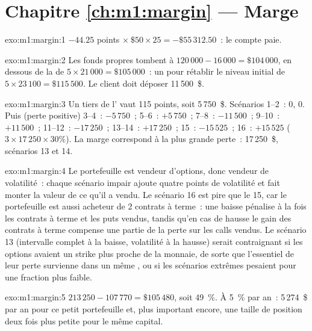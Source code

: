 \section*{Chapitre \ref{ch:m1:margin} --- Marge}

\begin{solution}{exo:m1:margin:1}
$-44.25$ points $\times\ \$50 \times 25 = -\$55\,312.50$~: le compte paie.
\end{solution}

\begin{solution}{exo:m1:margin:2}
Les fonds propres tombent à $120\,000 - 16\,000 = \$104\,000$, en dessous
de la  de $5 \times 21\,000 = \$105\,000$~: un 
pour rétablir le niveau initial de $5 \times 23\,100 = \$115\,500$. Le client doit déposer 11\,500~\$.
\end{solution}

\begin{solution}{exo:m1:margin:3}
Un tiers de l' vaut 115 points, soit 5\,750~\$. Scénarios 1--2~: 0, 0. Puis
(perte positive) 3--4~: $-5\,750$~; 5--6~: $+5\,750$~; 7--8~: $-11\,500$~; 9--10~:
$+11\,500$~; 11--12~: $-17\,250$~; 13--14~: $+17\,250$~; 15~: $-15\,525$~; 16~:
$+15\,525$ ($3 \times 17\,250 \times 30\%$). La marge correspond à la plus grande perte~:
17\,250~\$, scénarios 13 et 14.
\end{solution}

\begin{solution}{exo:m1:margin:4}
Le portefeuille est vendeur d'options, donc vendeur de volatilité~: chaque scénario impair
ajoute quatre points de volatilité et fait monter la valeur de ce qu'il a vendu.
Le scénario 16 est pire que le 15, car le portefeuille est aussi acheteur de 2 contrats à terme~:
une baisse pénalise à la fois les contrats à terme et les puts vendus, tandis qu'en cas de hausse le
gain des contrats à terme compense une partie de la perte sur les calls vendus. Le scénario 13 (intervalle complet
à la baisse, volatilité à la hausse) serait contraignant si les options avaient un strike plus proche de la
monnaie, de sorte que l'essentiel de leur perte survienne dans un même , ou si les
scénarios extrêmes pesaient pour une fraction plus faible.
\end{solution}

\begin{solution}{exo:m1:margin:5}
$213\,250 - 107\,770 = \$105\,480$, soit 49~\%. À 5~\% par an~: 5\,274~\$ par an pour ce
petit portefeuille et, plus important encore, une taille de position deux fois plus petite pour le même
capital.
\end{solution}

